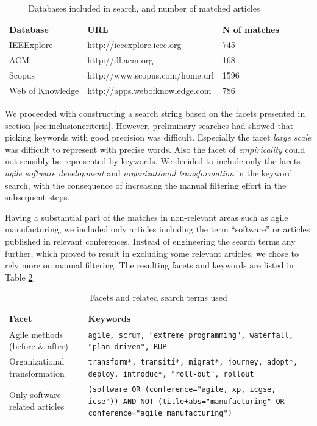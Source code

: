 \documentclass[preprint,authoryear,12pt]{elsarticle}
\begin{document}
\begin{table}
    \centering
    \begin{tabular}{ l l l }
        \toprule
        Database         & URL                         & N of matches   \\
        \midrule
        IEEExplore       & http://ieeexplore.ieee.org      & 745 \\ 
        ACM              & http://dl.acm.org               & 168 \\
        Scopus           & http://www.scopus.com/home.url  & 1596 \\
        Web of Knowledge & http://apps.webofknowledge.com  & 786 \\
        \bottomrule
    \end{tabular}
    \caption{Databases included in search, and number of matched articles}
    \label{table:databases}
\end{table}

We proceeded with constructing a search string based on the facets presented in
section \ref{sec:inclusioncriteria}. However, preliminary searches had showed
that picking keywords with good precision was difficult. Especially the facet
\emph{large scale} was difficult to represent with precise words. Also the facet
of \emph{empiricality} could not sensibly be represented by keywords. We decided
to include only the facets \emph{agile software development} and
\emph{organizational transformation} in the keyword search, with the consequence
of increasing the manual filtering effort in the subsequent steps.

Having a substantial part of the matches in non-relevant areas such as agile
manufacturing, we included only articles including the term ``software'' or
articles published in relevant conferences. Instead of engineering the search
terms any further, which proved to result in excluding some relevant articles,
we chose to rely more on manual filtering. The resulting facets and keywords are
listed in Table \ref{table:searchterms}.

\begin{table}
    \centering
    \begin{tabular}{ >{\raggedright\arraybackslash}p{}
                     >{\raggedright\arraybackslash}p{} }
        \toprule
        Facet                  & Keywords   \\
        \midrule
        Agile methods (before \& after) &
            \texttt{agile, scrum, "extreme programming",
            waterfall, "plan-driven", RUP}\\
        Organizational transformation &
            \texttt{transform*, transiti*, migrat*, journey, adopt*, deploy, introduc*,
            "roll-out", rollout}\\
        Only software related articles &
            \texttt{(software OR (conference="agile, xp, icgse, icse"))
            AND NOT (title+abs="manufacturing" OR conference="agile manufacturing")}
        \\
        \bottomrule
    \end{tabular}
    \caption{Facets and related search terms used}
    \label{table:searchterms}
\end{table}
\end{document}
